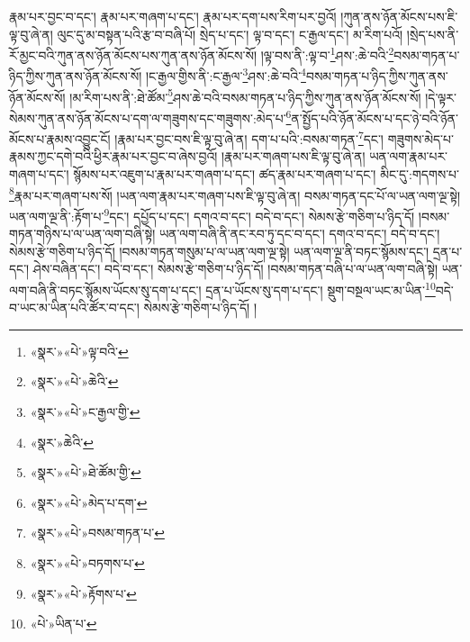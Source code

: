 རྣམ་པར་བྱང་བ་དང་། རྣམ་པར་གཞག་པ་དང་། རྣམ་པར་དག་པས་རིག་པར་བྱའོ། །ཀུན་ནས་ཉོན་མོངས་པས་ཇི་ལྟ་བུ་ཞེ་ན། ལུང་དུ་མ་བསྟན་པའི་རྩ་བ་བཞི་པོ། སྲེད་པ་དང་། ལྟ་བ་དང་། ང་རྒྱལ་དང་། མ་རིག་པའོ། །སྲེད་པས་ནི་རོ་མྱང་བའི་ཀུན་ནས་ཉོན་མོངས་པས་ཀུན་ནས་ཉོན་མོངས་སོ། །ལྟ་བས་ནི་:ལྟ་བ་\footnote{«སྣར་»«པེ་»ལྟ་བའི་}ཤས་:ཆེ་བའི་\footnote{«སྣར་»«པེ་»ཆེའི་}བསམ་གཏན་པ་ཉིད་ཀྱིས་ཀུན་ནས་ཉོན་མོངས་སོ། །ང་རྒྱལ་གྱིས་ནི་:ང་རྒྱལ་\footnote{«སྣར་»«པེ་»ང་རྒྱལ་གྱི་}ཤས་:ཆེ་བའི་\footnote{«སྣར་»ཆེའི་}བསམ་གཏན་པ་ཉིད་ཀྱིས་ཀུན་ནས་ཉོན་མོངས་སོ། །མ་རིག་པས་ནི་:ཐེ་ཚོམ་\footnote{«སྣར་»«པེ་»ཐེ་ཚོམ་གྱི་}ཤས་ཆེ་བའི་བསམ་གཏན་པ་ཉིད་ཀྱིས་ཀུན་ནས་ཉོན་མོངས་སོ། །དེ་ལྟར་སེམས་ཀུན་ནས་ཉོན་མོངས་པ་དག་ལ་གཟུགས་དང་གཟུགས་:མེད་པ་\footnote{«སྣར་»«པེ་»མེད་པ་དག་}ན་སྤྱོད་པའི་ཉོན་མོངས་པ་དང་ཉེ་བའི་ཉོན་མོངས་པ་རྣམས་འབྱུང་ངོ། །རྣམ་པར་བྱང་བས་ཇི་ལྟ་བུ་ཞེ་ན། དག་པ་པའི་:བསམ་གཏན་\footnote{«སྣར་»«པེ་»བསམ་གཏན་པ་}དང་། གཟུགས་མེད་པ་རྣམས་ཀྱང་དགེ་བའི་ཕྱིར་རྣམ་པར་བྱང་བ་ཞེས་བྱའོ། །རྣམ་པར་གཞག་པས་ཇི་ལྟ་བུ་ཞེ་ན། ཡན་ལག་རྣམ་པར་གཞག་པ་དང་། སྙོམས་པར་འཇུག་པ་རྣམ་པར་གཞག་པ་དང་། ཚད་རྣམ་པར་གཞག་པ་དང་། མིང་དུ་:གདགས་པ་\footnote{«སྣར་»«པེ་»བཏགས་པ་}རྣམ་པར་གཞག་པས་སོ། །ཡན་ལག་རྣམ་པར་གཞག་པས་ཇི་ལྟ་བུ་ཞེ་ན། བསམ་གཏན་དང་པོ་ལ་ཡན་ལག་ལྔ་སྟེ། ཡན་ལག་ལྔ་ནི་:རྟོག་པ་\footnote{«སྣར་»«པེ་»རྟོགས་པ་}དང་། དཔྱོད་པ་དང་། དགའ་བ་དང་། བདེ་བ་དང་། སེམས་རྩེ་གཅིག་པ་ཉིད་དོ། །བསམ་གཏན་གཉིས་པ་ལ་ཡན་ལག་བཞི་སྟེ། ཡན་ལག་བཞི་ནི་ནང་རབ་ཏུ་དང་བ་དང་། དགའ་བ་དང་། བདེ་བ་དང་། སེམས་རྩེ་གཅིག་པ་ཉིད་དོ། །བསམ་གཏན་གསུམ་པ་ལ་ཡན་ལག་ལྔ་སྟེ། ཡན་ལག་ལྔ་ནི་བཏང་སྙོམས་དང་། དྲན་པ་དང་། ཤེས་བཞིན་དང་། བདེ་བ་དང་། སེམས་རྩེ་གཅིག་པ་ཉིད་དོ། །བསམ་གཏན་བཞི་པ་ལ་ཡན་ལག་བཞི་སྟེ། ཡན་ལག་བཞི་ནི་བཏང་སྙོམས་ཡོངས་སུ་དག་པ་དང་། དྲན་པ་ཡོངས་སུ་དག་པ་དང་། སྡུག་བསྔལ་ཡང་མ་ཡིན་\footnote{«པེ་»ཡིན་པ་}བདེ་བ་ཡང་མ་ཡིན་པའི་ཚོར་བ་དང་། སེམས་རྩེ་གཅིག་པ་ཉིད་དོ། །
